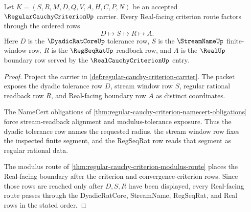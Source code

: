 \begin{theorem}
\label{thm:regular-cauchy-criterion-regseqrat-route}
Let $K=(S,R,M,D,Q,V,A,H,C,P,N)$ be an accepted $\RegularCauchyCriterionUp$ carrier. Every Real-facing criterion route factors through the ordered rows
$$
D \longmapsto S \longmapsto R \longmapsto A .
$$
Here $D$ is the $\DyadicRatCoreUp$ tolerance row, $S$ is the $\StreamNameUp$ finite-window row, $R$ is the $\RegSeqRatUp$ readback row, and $A$ is the $\RealUp$ boundary row served by the $\RealCauchyCriterionUp$ entry.
\end{theorem}
\begin{proof}
Project the carrier in \autoref{def:regular-cauchy-criterion-carrier}. The packet exposes the dyadic tolerance row $D$, stream window row $S$, regular rational readback row $R$, and Real-facing boundary row $A$ as distinct coordinates.

The NameCert obligations of \autoref{thm:regular-cauchy-criterion-namecert-obligations} force stream-readback alignment and modulus-tolerance exposure. Thus the dyadic tolerance row names the requested radius, the stream window row fixes the inspected finite segment, and the RegSeqRat row reads that segment as regular rational data.

The modulus route of \autoref{thm:regular-cauchy-criterion-modulus-route} places the Real-facing boundary after the criterion and convergence-criterion rows. Since those rows are reached only after $D,S,R$ have been displayed, every Real-facing route passes through the DyadicRatCore, StreamName, RegSeqRat, and Real rows in the stated order.
\end{proof}

